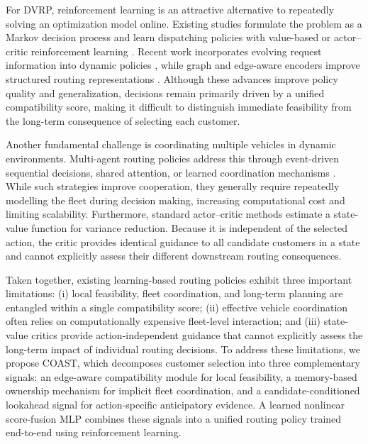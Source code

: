 \documentclass[letterpaper]{article}
\begin{document}
For DVRP, reinforcement learning is an attractive alternative to repeatedly solving an optimization model online. Existing studies formulate the problem as a Markov decision process and learn dispatching policies with value-based or actor--critic reinforcement learning \cite{akkerman2025comparison,konovalenko2024optimizing}. Recent work incorporates evolving request information into dynamic policies \cite{konovalenko2024optimizing,bono2021mardam}, while graph and edge-aware encoders improve structured routing representations \cite{meng2025eformer}. Although these advances improve policy quality and generalization, decisions remain primarily driven by a unified compatibility score, making it difficult to distinguish immediate feasibility from the long-term consequence of selecting each customer.

Another fundamental challenge is coordinating multiple vehicles in dynamic environments. Multi-agent routing policies address this through event-driven sequential decisions, shared attention, or learned coordination mechanisms \cite{bono2021mardam,zhang2020multi,shahbazian2025knowledge}. While such strategies improve cooperation, they generally require repeatedly modelling the fleet during decision making, increasing computational cost and limiting scalability. Furthermore, standard actor--critic methods estimate a state-value function for variance reduction. Because it is independent of the selected action, the critic provides identical guidance to all candidate customers in a state and cannot explicitly assess their different downstream routing consequences.

Taken together, existing learning-based routing policies exhibit three important limitations: (i) local feasibility, fleet coordination, and long-term planning are entangled within a single compatibility score; (ii) effective vehicle coordination often relies on computationally expensive fleet-level interaction; and (iii) state-value critics provide action-independent guidance that cannot explicitly assess the long-term impact of individual routing decisions. To address these limitations, we propose COAST, which decomposes customer selection into three complementary signals: an edge-aware compatibility module for local feasibility, a memory-based ownership mechanism for implicit fleet coordination, and a candidate-conditioned lookahead signal for action-specific anticipatory evidence. A learned nonlinear score-fusion MLP combines these signals into a unified routing policy trained end-to-end using reinforcement learning.
\end{document}
